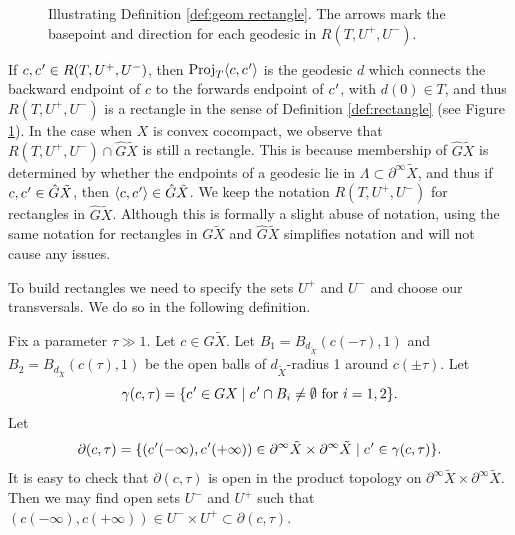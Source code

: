 \documentclass[JEP,XML,SOM,Unicode,NoFloatCountersInSection]{cedram}
\let\sep\mid
\newcommand{\cpr}{c\mkern1mu'}
\theoremstyle{definition}
\numberwithin{equation}{section}
\DeclareMathOperator{\Proj}{Proj}
\begin{document}
\begin{figure}[htb]
\caption{Illustrating Definition \ref{def:geom rectangle}. The arrows mark the basepoint and direction for each geodesic in $R(T,U^+,U^-)$.}\label{fig:geom rectangle}
\end{figure}
If $c, \cpr \in R(T,U^+,U^-)$, then $\Proj_T \langle c, \cpr\rangle $ is the geodesic $d$ which connects the backward endpoint of $c$ to the forwards endpoint of $\cpr$, with $d(0)\in T$, and thus $R(T,U^+,U^-)$ is a rectangle in the sense of Definition \ref{def:rectangle} (see Figure \ref{fig:geom rectangle}). In the case when $X$ is convex cocompact, we observe that $R(T, U^+, U^-)\cap \hat G\tilde X$ is still a rectangle. This is because membership of $\hat G\tilde X$ is determined by whether the endpoints of a geodesic lie in $\Lambda \subset \partial^\infty\tilde X$, and thus if $c, \cpr\in \hat G\tilde X$, then $\langle c,\cpr\rangle \in \hat G\tilde X$. We keep the notation $R(T, U^+, U^-)$ for rectangles in $\hat G \tilde X$. Although this is formally a slight abuse of notation, using the same notation for rectangles in $G \tilde X$ and $\hat G \tilde X$ simplifies notation and will not cause any issues.

To build rectangles we need to specify the sets $U^+$ and $U^-$ and choose our transversals. We do so in the following definition.

Fix a parameter $\tau \gg 1$. Let $c\in G\tilde X$. Let $B_1 = B_{d_{\tilde X}}(c(-\tau),1)$ and $B_2 = B_{d_{\tilde X}}(c(\tau),1)$ be the open balls of $d_{\tilde X}$-radius 1 around $c(\pm\tau)$. Let
\[ \gamma(c, \tau) = \{ \cpr\in GX \sep \cpr \cap B_i \neq \emptyset \mbox{ for } i=1,2 \}. \]
Let
\[ \partial (c, \tau) = \{ (\cpr(-\infty), \cpr(+\infty)) \in \partial^\infty \tilde X \times \partial^\infty \tilde X \sep \cpr\in \gamma(c,\tau) \}.\]
It is easy to check that $\partial (c, \tau)$ is open in the product topology on $\partial^\infty \tilde X \times \partial^\infty \tilde X$. Then we may find open sets $U^-$ and $U^+$ such that $(c(-\infty), c(+\infty)) \in U^- \times U^+ \subset \partial (c, \tau)$.
\end{document}
